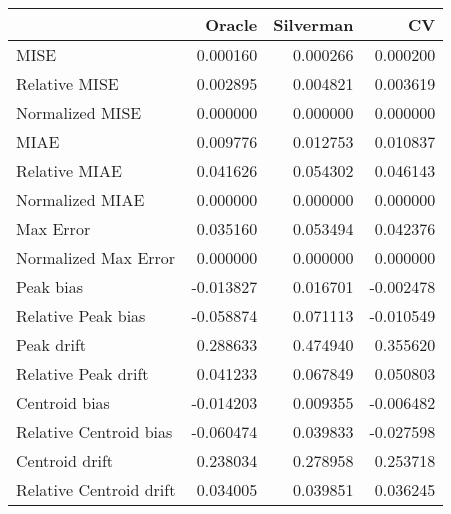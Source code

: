 \begin{tabular}{lrrr}
  \hline
 & Oracle & Silverman & CV \\ 
  \hline
MISE & 0.000160 & 0.000266 & 0.000200 \\ 
  Relative MISE & 0.002895 & 0.004821 & 0.003619 \\ 
  Normalized MISE & 0.000000 & 0.000000 & 0.000000 \\ 
  MIAE & 0.009776 & 0.012753 & 0.010837 \\ 
  Relative MIAE & 0.041626 & 0.054302 & 0.046143 \\ 
  Normalized MIAE & 0.000000 & 0.000000 & 0.000000 \\ 
  Max Error & 0.035160 & 0.053494 & 0.042376 \\ 
  Normalized Max Error & 0.000000 & 0.000000 & 0.000000 \\ 
  Peak bias & -0.013827 & 0.016701 & -0.002478 \\ 
  Relative Peak bias & -0.058874 & 0.071113 & -0.010549 \\ 
  Peak drift & 0.288633 & 0.474940 & 0.355620 \\ 
  Relative Peak drift & 0.041233 & 0.067849 & 0.050803 \\ 
  Centroid bias & -0.014203 & 0.009355 & -0.006482 \\ 
  Relative Centroid bias & -0.060474 & 0.039833 & -0.027598 \\ 
  Centroid drift & 0.238034 & 0.278958 & 0.253718 \\ 
  Relative Centroid drift & 0.034005 & 0.039851 & 0.036245 \\ 
   \hline
\end{tabular}
